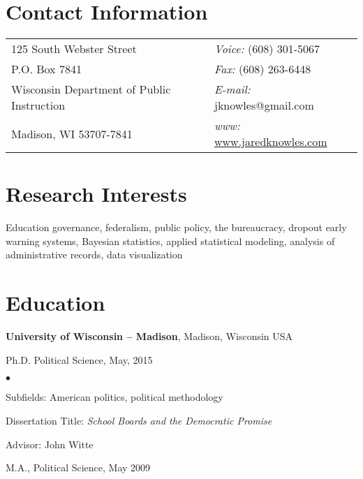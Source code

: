 \documentclass[margin,line]{res}
\newenvironment{list1}{
  \begin{list}{\ding{113}}{%
      \setlength{\itemsep}{0in}
      \setlength{\parsep}{0in} \setlength{\parskip}{0in}
      \setlength{\topsep}{0in} \setlength{\partopsep}{0in} 
      \setlength{\leftmargin}{0.17in}}}{\end{list}}
\newenvironment{list2}{
  \begin{list}{$\bullet$}{%
      \setlength{\itemsep}{0in}
      \setlength{\parsep}{0in} \setlength{\parskip}{0in}
      \setlength{\topsep}{0in} \setlength{\partopsep}{0in} 
      \setlength{\leftmargin}{0.2in}}}{\end{list}}
\begin{document}

\begin{resume}
\section{\sc Contact Information}
\vspace{.05in}
\begin{tabular}{@{}p{2.75in}p{2.75in}}
125 South Webster Street & {\it Voice:}  (608) 301-5067 \\            
P.O. Box 7841 & {\it Fax:}    (608) 263-6448  \\         
Wisconsin Department of Public Instruction & {\it E-mail:}  jknowles@gmail.com\\       
Madison, WI  53707-7841 & {\it www:} \url{www.jaredknowles.com} \\     
\end{tabular}


\section{\sc Research Interests}
Education governance, federalism, public policy, the bureaucracy, dropout early warning systems, Bayesian statistics, applied statistical modeling, analysis of administrative records, data visualization

\section{\sc Education}
{\bf University of Wisconsin -- Madison}, Madison, Wisconsin USA\\
\vspace*{-.1in}
\begin{list1}
\item[] Ph.D. Political Science, May, 2015
\begin{list2}
\vspace*{.05in}
\item Subfields: American politics, political methodology
\item Dissertation Title: \emph {School Boards and the Democratic Promise} 
\item Advisor:  John Witte
\end{list2}
\vspace*{.05in}
\item[] M.A., Political Science,  May 2009
\end{list1}


\end{resume}
\end{document}
